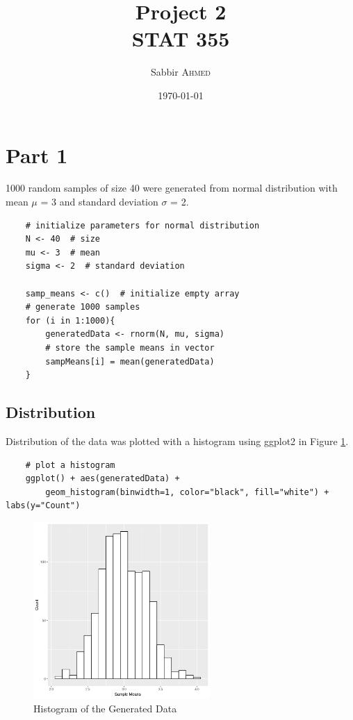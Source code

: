 \documentclass{article}
\title{Project 2 \\ STAT 355} %
\author{Sabbir \textsc{Ahmed}} %
\date{\today} %
\begin{document}
    \maketitle %

    \section{Part 1}
        1000 random samples of size 40 were generated from normal distribution with mean $\mu$ = 3 and standard deviation $\sigma$ = 2.

\begin{lstlisting}
    # initialize parameters for normal distribution
    N <- 40  # size
    mu <- 3  # mean
    sigma <- 2  # standard deviation

    samp_means <- c()  # initialize empty array
    # generate 1000 samples
    for (i in 1:1000){
        generatedData <- rnorm(N, mu, sigma)
        # store the sample means in vector
        sampMeans[i] = mean(generatedData)
    }
\end{lstlisting}

    

        \subsection{Distribution}
            Distribution of the data was plotted with a histogram using ggplot2 in Figure \ref{fig:hist}.
\begin{lstlisting}
    # plot a histogram
    ggplot() + aes(generatedData) + 
        geom_histogram(binwidth=1, color="black", fill="white") + labs(y="Count")
\end{lstlisting}

            \begin{figure}[h]
                \begin{center}
                    \includegraphics[width=0.6\textwidth]{figures/hist1.png}
                    \caption{Histogram of the Generated Data} \label{fig:hist}
                \end{center}
            \end{figure}

    \clearpage
    \newpage
\end{document}
